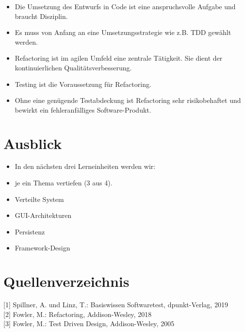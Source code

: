 \documentclass[10pt]{article}
\begin{document}
\begin{itemize}
  \item Die Umsetzung des Entwurfs in Code ist eine anspruchsvolle Aufgabe und braucht Disziplin.
  \item Es muss von Anfang an eine Umsetzungsstrategie wie z.B. TDD gewählt werden.
  \item Refactoring ist im agilen Umfeld eine zentrale Tätigkeit. Sie dient der kontinuierlichen Qualitätsverbesserung.
  \item Testing ist die Voraussetzung für Refactoring.
  \item Ohne eine genügende Testabdeckung ist Refactoring sehr risikobehaftet und bewirkt ein fehleranfälliges Software-Produkt.
\end{itemize}

\section*{Ausblick}
\begin{itemize}
  \item In den nächsten drei Lerneinheiten werden wir:
  \item je ein Thema vertiefen (3 aus 4).
  \item Verteilte System
  \item GUI-Architekturen
  \item Persistenz
  \item Framework-Design
\end{itemize}

\section*{Quellenverzeichnis}
[1] Spillner, A. und Linz, T.: Basiswissen Softwaretest, dpunkt-Verlag, 2019\\[0pt]
[2] Fowler, M.: Refactoring, Addison-Wesley, 2018\\[0pt]
[3] Fowler, M.: Test Driven Design, Addison-Wesley, 2005
\end{document}
